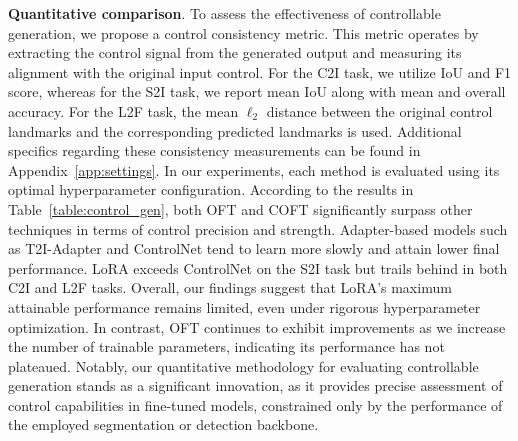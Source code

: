 \textbf{Quantitative comparison}. To assess the effectiveness of controllable generation, we propose a control consistency metric. This metric operates by extracting the control signal from the generated output and measuring its alignment with the original input control. For the C2I task, we utilize IoU and F1 score, whereas for the S2I task, we report mean IoU along with mean and overall accuracy. For the L2F task, the mean $\ell_2$ distance between the original control landmarks and the corresponding predicted landmarks is used. Additional specifics regarding these consistency measurements can be found in Appendix~\ref{app:settings}. In our experiments, each method is evaluated using its optimal hyperparameter configuration. According to the results in Table~\ref{table:control_gen}, both OFT and COFT significantly surpass other techniques in terms of control precision and strength. Adapter-based models such as T2I-Adapter and ControlNet tend to learn more slowly and attain lower final performance. LoRA exceeds ControlNet on the S2I task but trails behind in both C2I and L2F tasks. Overall, our findings suggest that LoRA’s maximum attainable performance remains limited, even under rigorous hyperparameter optimization. In contrast, OFT continues to exhibit improvements as we increase the number of trainable parameters, indicating its performance has not plateaued. Notably, our quantitative methodology for evaluating controllable generation stands as a significant innovation, as it provides precise assessment of control capabilities in fine-tuned models, constrained only by the performance of the employed segmentation or detection backbone.

